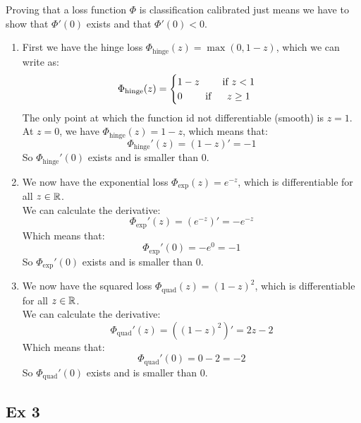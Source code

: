 \documentclass[12pt]{article}
\begin{document}
Proving that a loss function $\Phi$
is classification calibrated
just means we have to show that $\Phi'(0)$
exists and that $\Phi'(0) < 0$. \\
\begin{enumerate}[label = \alph*)]
    \item 
    First we have the hinge loss
    $\Phi_{\text{hinge}}(z) = \max(0, 1-z)$,
    which we can write as:
    \[ \Phi_{\text{hinge}}(z) = 
    \begin{cases} 1-z \qquad \text{ if } z < 1 \\ 0 \qquad \text{ if } \quad \; z \geq 1 \end{cases} \]
    The only point at which the function
    id not differentiable (smooth) is $z = 1$. \\
    At $z = 0$, we have 
    $\Phi_{\text{hinge}}(z) = 1-z$,
    which means that:
    \[ \Phi_{\text{hinge}}'(z) = (1-z)' = -1 \]
    So $\Phi_{\text{hinge}}'(0)$ 
    exists and is smaller than $0$.
    \item 
    We now have the exponential loss
    $\Phi_{\text{exp}}(z) = e^{-z}$,
    which is differentiable for all $z \in \mathbb{R}$. \\
    We can calculate the derivative:
    \[ \Phi_{\text{exp}}'(z) = (e^{-z})' = -e^{-z} \]
    Which means that:
    \[ \Phi_{\text{exp}}'(0) = -e^{0} = -1 \]
    So $\Phi_{\text{exp}}'(0)$
    exists and is smaller than $0$.
    \item 
    We now have the squared loss
    $\Phi_{\text{quad}}(z) = (1-z)^2$,
    which is differentiable for all $z \in \mathbb{R}$. \\
    We can calculate the derivative:
    \[ \Phi_{\text{quad}}'(z) = ((1-z)^2)' = 2z -2 \]
    Which means that:
    \[ \Phi_{\text{quad}}'(0) = 0 -2 = -2 \]
    So $\Phi_{\text{quad}}'(0)$
    exists and is smaller than $0$. \\
\end{enumerate}

\newpage

\subsection*{Ex 3}
\end{document}
